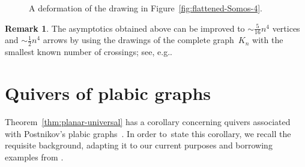 \documentclass[10pt]{amsart}
\theoremstyle{definition}
\newtheorem{remark}[theorem]{Remark}
\newcommand{\eg}{e.g.}
\begin{document}
\begin{figure}[ht]\centering
{}

\caption{A deformation of the drawing in Figure~\ref{fig:flattened-Somos-4}.}
\label{fig:very-flattened-Somos-4}
\end{figure}

\begin{remark}
The asymptotics obtained above can be improved to $\sim\frac5{16} n^4$ vertices and $\sim \frac12 n^4$ arrows by using the drawings of the complete graph~$K_n$ with the smallest known number of crossings; see, \eg \cite[Section~13.2]{szekely}. 
\end{remark}


\section{Quivers of plabic graphs}
\label{sec:quivers-plabic}

Theorem~\ref{thm:planar-universal} has a corollary concerning quivers
associated with Postnikov's plabic graphs~\cite{postnikov}. 
In order to~state this corollary, we recall the requisite background,
adapting it to our current purposes and borrowing examples from
\cite[Section~6]{FPST}. 
\end{document}
